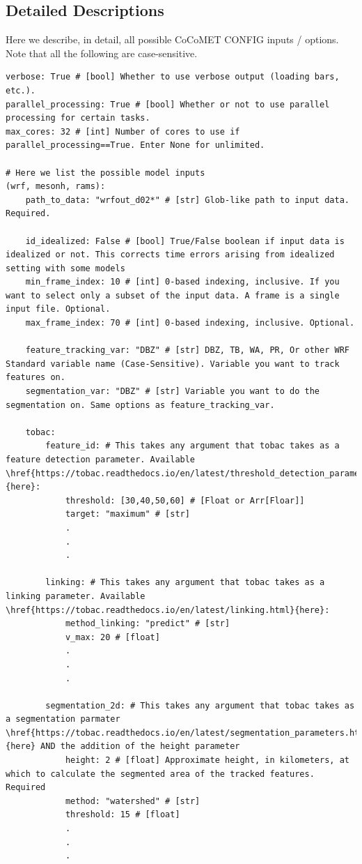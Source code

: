 \documentclass[10pt,a4paper]{article}
\begin{document}
		\subsection{Detailed Descriptions}
		Here we describe, in detail, all possible CoCoMET CONFIG inputs / options. Note that all the following are case-sensitive.
	
		\begin{lstlisting}
verbose: True # [bool] Whether to use verbose output (loading bars, etc.).
parallel_processing: True # [bool] Whether or not to use parallel processing for certain tasks.
max_cores: 32 # [int] Number of cores to use if parallel_processing==True. Enter None for unlimited.

# Here we list the possible model inputs
(wrf, mesonh, rams):
	path_to_data: "wrfout_d02*" # [str] Glob-like path to input data. Required.
	
	id_idealized: False # [bool] True/False boolean if input data is idealized or not. This corrects time errors arising from idealized setting with some models
	min_frame_index: 10 # [int] 0-based indexing, inclusive. If you want to select only a subset of the input data. A frame is a single input file. Optional.
	max_frame_index: 70 # [int] 0-based indexing, inclusive. Optional.
	
	feature_tracking_var: "DBZ" # [str] DBZ, TB, WA, PR, Or other WRF Standard variable name (Case-Sensitive). Variable you want to track features on.
	segmentation_var: "DBZ" # [str] Variable you want to do the segmentation on. Same options as feature_tracking_var.
	
	tobac:
		feature_id: # This takes any argument that tobac takes as a feature detection parameter. Available \href{https://tobac.readthedocs.io/en/latest/threshold_detection_parameters.html}{here}:
			threshold: [30,40,50,60] # [Float or Arr[Floar]]
			target: "maximum" # [str]
			.
			.
			.
			
		linking: # This takes any argument that tobac takes as a linking parameter. Available \href{https://tobac.readthedocs.io/en/latest/linking.html}{here}:
			method_linking: "predict" # [str]
			v_max: 20 # [float]
			.
			.
			.
		
		segmentation_2d: # This takes any argument that tobac takes as a segmentation parmater \href{https://tobac.readthedocs.io/en/latest/segmentation_parameters.html}{here} AND the addition of the height parameter
			height: 2 # [float] Approximate height, in kilometers, at which to calculate the segmented area of the tracked features. Required
			method: "watershed" # [str]
			threshold: 15 # [float]
			.
			.
			.
		

\end{lstlisting}
\end{document}
